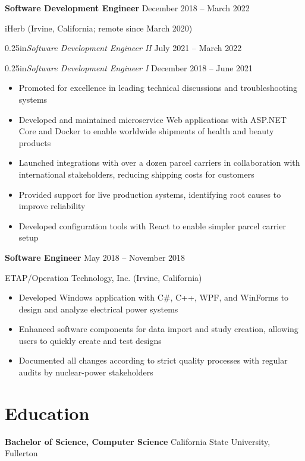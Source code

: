 \documentclass[12pt]{article}
\newcommand{\titleheader}[2]{\textbf{#1} \symbol{"B7} #2}
\newcommand{\secondaryheader}[2]{\begin{adjustwidth}{0.25in}{}\textit{#1} \symbol{"B7} #2\end{adjustwidth}}
\newcommand{\locheader}[2]{#1 (#2)}
\begin{document}
	\titleheader{Software Development Engineer}{December 2018 -- March 2022}

	\locheader{iHerb}{Irvine, California; remote since March 2020}

	\secondaryheader{Software Development Engineer II}{July 2021 -- March 2022}

	\secondaryheader{Software Development Engineer I}{December 2018 -- June 2021}

	\begin{itemize}
		\item Promoted for excellence in leading technical discussions and troubleshooting systems
		\item Developed and maintained microservice Web applications with ASP.NET Core and Docker to enable worldwide shipments of health and beauty products
		\item Launched integrations with over a dozen parcel carriers in collaboration with international stakeholders, reducing shipping costs for customers
		\item Provided support for live production systems, identifying root causes to improve reliability
		\item Developed configuration tools with React to enable simpler parcel carrier setup
	\end{itemize}

	\titleheader{Software Engineer}{May 2018 -- November 2018}

	\locheader{ETAP/Operation Technology, Inc.}{Irvine, California}

	\begin{itemize}
		\item Developed Windows application with C\#, C++, WPF, and WinForms to design and analyze electrical power systems
		\item Enhanced software components for data import and study creation, allowing users to quickly create and test designs
		\item Documented all changes according to strict quality processes with regular audits by nuclear-power stakeholders
	\end{itemize}

	\section*{Education}

	\textbf{Bachelor of Science, Computer Science}  California State University, Fullerton
\end{document}
